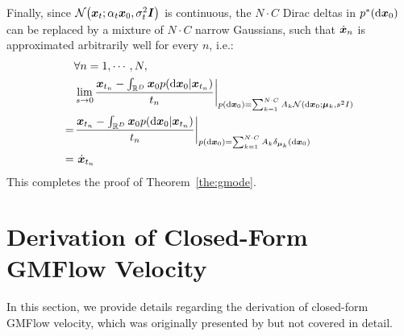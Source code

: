 Finally, since $\mathcal{N}\left(\vx_t; \alpha_t \vx_0, \sigma_t^2 \mI\right)$ is continuous, the $N\cdot C$ Dirac deltas in $p^\ast(\mathop{}\!\mathrm{d} {\bm{x}}_0)$ can be replaced by a mixture of $N\cdot C$ narrow Gaussians, such that $\dot{{\bm{x}}}_n$ is approximated arbitrarily well for every $n$, i.e.:
\begin{align}
    & \forall n=1,\cdots,N, \notag \\
    & \lim_{s\to 0} \left. \frac{\vx_{t_n} - \int_{\R^D} \vx_0 p(\diff \vx_0 | \vx_{t_n})}{t_n} \right\rvert_{p(\diff \vx_0)=\sum_{k=1}^{N\cdot C} A_k \mathcal{N}(\diff \vx_0;\vmu_k,s^2I)} \notag \\
    =& \left. \frac{\vx_{t_n} - \int_{\R^D} \vx_0 p(\diff \vx_0 | \vx_{t_n})}{t_n} \right\rvert_{p(\diff \vx_0)=\sum_{k=1}^{N\cdot C} A_k \delta_{\vmu_k}(\diff \vx_0)} \notag \\
    =&\ \dot{\vx}_{t_n}
\end{align}
This completes the proof of Theorem~\ref{the:gmode}.

\section{Derivation of Closed-Form GMFlow Velocity}
\label{sec:gm_u}
In this section, we provide details regarding the derivation of closed-form GMFlow velocity, which was originally presented by \citet{gmflow} but not covered in detail.

